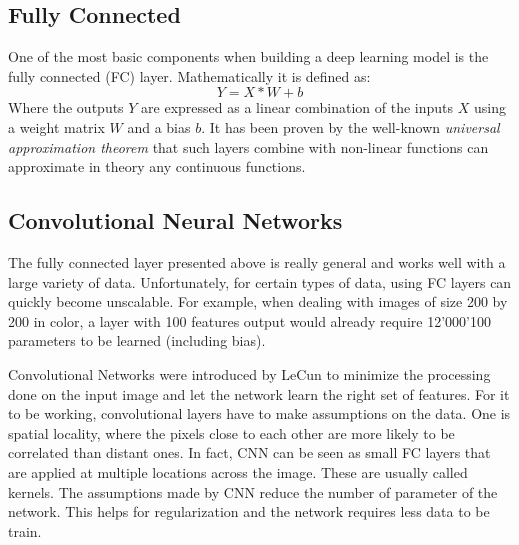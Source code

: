 \subsection{Fully Connected}

One of the most basic components when building a deep learning model is the fully connected (FC) layer. Mathematically it is defined as:
$$Y=X*W + b$$
Where the outputs $Y$ are expressed as a linear combination of the inputs $X$ using a weight matrix $W$ and a bias $b$. It has been proven by the well-known \textit{universal approximation theorem}\cite{universal_approx_theorem_10.5555/70405.70408} that such layers combine with non-linear functions can approximate in theory any continuous functions.

\subsection{Convolutional Neural Networks}

The fully connected layer presented above is really general and works well with a large variety of data. Unfortunately, for certain types of data, using FC layers can quickly become unscalable. For example, when dealing with images of size 200 by 200 in color, a layer with 100 features output would already require 12'000'100 parameters to be learned (including bias). 

Convolutional Networks\cite{cnn_original_paper_10.5555/646469.691875} were introduced by LeCun to minimize the processing done on the input image and let the network learn the right set of features. For it to be working, convolutional layers have to make assumptions on the data. One is spatial locality, where the pixels close to each other are more likely to be correlated than distant ones. In fact, CNN can be seen as small FC layers that are applied at multiple locations across the image. These are usually called kernels. The assumptions made by CNN reduce the number of parameter of the network. This helps for regularization and the network requires less data to be train.


